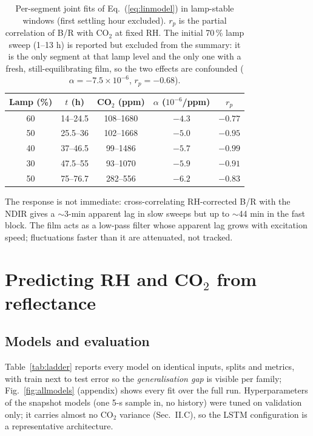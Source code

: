 \documentclass[twocolumn]{revtex4}
\begin{document}
\begin{table}[b!]
\centering
\caption{Per-segment joint fits of Eq.~(\ref{eq:linmodel}) in lamp-stable
windows (first settling hour excluded). $r_p$ is the partial correlation of
B/R with CO$_2$ at fixed RH. The initial 70\,\% lamp sweep (1--13 h) is reported but excluded from
the summary: it is the only segment at that lamp level and the only one
with a fresh, still-equilibrating film, so the two effects are confounded
($\alpha=-7.5\times10^{-6}$, $r_p=-0.68$).}
\label{tab:sens}
\vspace*{1mm}
\begin{tabular}{ccccc}
\hline\hline
Lamp (\%) & $t$ (h) & CO$_2$ (ppm) & $\alpha$ ($10^{-6}$/ppm) & $r_p$ \\
\hline
60 & 14--24.5 & 108--1680 & $-4.3$ & $-0.77$ \\
50 & 25.5--36 & 102--1668 & $-5.0$ & $-0.95$ \\
40 & 37--46.5 & 99--1486  & $-5.7$ & $-0.99$ \\
30 & 47.5--55 & 93--1070  & $-5.9$ & $-0.91$ \\
50 & 75--76.7 & 282--556  & $-6.2$ & $-0.83$ \\
\hline\hline
\end{tabular}
\end{table}

The response is not immediate: cross-correlating RH-corrected B/R
with the NDIR gives a $\sim$3-min apparent lag in slow sweeps but up to
$\sim$44 min in the fast block. The film acts as a low-pass filter whose apparent lag grows with
excitation speed; fluctuations faster than it are attenuated, not
tracked.

\section{Predicting RH and CO$_2$ from reflectance}

\subsection{Models and evaluation}

Table~\ref{tab:ladder} reports every model on identical inputs,
splits and metrics, with train next to test error so the
\emph{generalisation gap} is visible per family;
Fig.~\ref{fig:allmodels} (appendix) shows every fit over the full run.
Hyperparameters of the snapshot models (one 5-s sample in, no history) were tuned on validation only; it
carries almost no CO$_2$ variance (Sec.~II.C), so the LSTM configuration
is a representative architecture.
\end{document}
